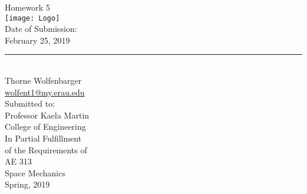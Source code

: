 \begin{center}
  {\huge Homework 5}\\
  \vspace{10px}
  \texttt{[image: Logo]} \\
  Date of Submission:\\
  February 25, 2019\\
  \vspace{30px}
  \rule{300px}{0.5px} \\
  Thorne Wolfenbarger \\
  \href{mailto:wolfent1@my.erau.edu}{wolfent1@my.erau.edu} \\
  \vspace{30px}
  Submitted to: \\
  Professor Kaela Martin \\
  College of Engineering \\
  \vspace{40px}
  In Partial Fulfillment \\
  of the Requirements of \\
  \vspace{10px}
  AE 313 \\
  Space Mechanics \\
  Spring, 2019 \\
\end{center}
